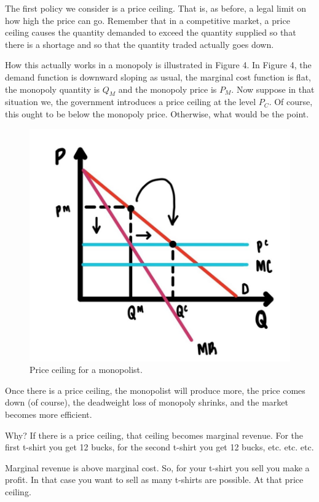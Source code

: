 \documentclass[
]{book}
\begin{document}
The first policy we consider is a price ceiling. That is, as before, a legal limit on how high the price can go. Remember that in a competitive market, a price ceiling causes the quantity demanded to exceed the quantity supplied so that there is a shortage and so that the quantity traded actually goes down.

How this actually works in a monopoly is illustrated in Figure 4. In Figure 4, the demand function is downward sloping as usual, the marginal cost function is flat, the monopoly quantity is \(Q_M\) and the monopoly price is \(P_M\). Now suppose in that situation we, the government introduces a price ceiling at the level \(P_C\). Of course, this ought to be below the monopoly price. Otherwise, what would be the point.

\begin{figure}

{\centering \includegraphics[width=0.75\linewidth]{img/monopoly/fig5} 

}

\caption{Price ceiling for a monopolist.}\label{fig:monopoly05}
\end{figure}

Once there is a price ceiling, the monopolist will produce more, the price comes down (of course), the deadweight loss of monopoly shrinks, and the market becomes more efficient.

Why? If there is a price ceiling, that ceiling becomes marginal revenue. For the first t-shirt you get 12 bucks, for the second t-shirt you get 12 bucks, etc. etc. etc.

Marginal revenue is above marginal cost. So, for your t-shirt you sell you make a profit. In that case you want to sell as many t-shirts are possible. At that price ceiling.
\end{document}
